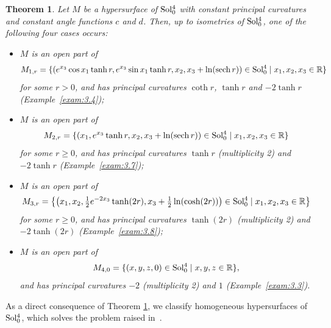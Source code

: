 \documentclass[reqno]{amsart}%
\newtheorem{theorem}{Theorem}[section]   %
\theoremstyle{definition}
\numberwithin{equation}{section}
\begin{document}
	\begin{theorem}\label{thm:1.1}
		Let $M$ be a hypersurface of ${\rm Sol_0^4}$ with
		constant principal curvatures and constant angle functions $c$ and $d$.
		Then, up to isometries of ${\rm Sol_0^4}$, one of the
		following four cases occurs:
		\begin{itemize}
			
			\vskip1mm
			\item[(1)]
			$M$ is an open part of 
			\[M_{1,r}=\{(e^{x_3}\cos x_1 \tanh r,e^{x_3}\sin x_1 \tanh r,x_2,{x_3}+\ln ({\rm sech}\, r))\in {\rm Sol_0^4} \mid x_1,x_2,x_3\in \mathbb{R}\}\] 
			for some $r>0$, and has principal curvatures $\coth r$, $\tanh r$ and $-2\tanh r$ (Example~\ref{exam:3.4});
			
			\vskip1mm
			\item[(2)]
			$M$ is an open part of 
			\[M_{2,r}=\{(x_1,e^{x_3}\tanh r,x_2,{x_3}+\ln ({\rm sech}\, r))\in {\rm Sol_0^4}\mid x_1,x_2,x_3\in \mathbb{R}\}\] 
			for some $r\geq0$, and has principal curvatures $\tanh r$ (multiplicity 2) and $-2\tanh r$  (Example~\ref{exam:3.7});
			
			\vskip1mm
			\item[(3)]
			$M$ is an open part of 
			\[M_{3,r}=\left\{\left(x_1,x_2,\tfrac{1}{2}e^{-2x_3}\tanh(2r),x_3+\tfrac{1}{2}\ln(\cosh(2r))\right)\in {\rm Sol_0^4}\mid x_1,x_2,x_3\in \mathbb{R}\right\}\] 
			for some $r\geq0$, and has principal curvatures $\tanh(2r)$ (multiplicity 2) and $-2\tanh(2r)$ (Example~\ref{exam:3.8});
			
			\vskip1mm
			\item[(4)]
			$M$ is an open part of \[M_{4,0}=\{(x,y,z,0)\in {\rm Sol_0^4}\mid x,y,z\in \mathbb{R}\},\] and has principal curvatures $-2$ (multiplicity 2) and $1$ (Example~\ref{exam:3.3}).
		\end{itemize}
	\end{theorem}
	
	As a direct consequence of Theorem \ref{thm:1.1},
	we classify homogeneous hypersurfaces of ${\rm Sol_0^4}$,
	which solves the problem raised in~\cite{EI2}.
	
\end{document}
